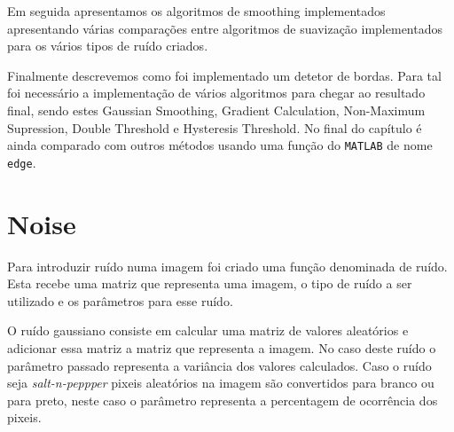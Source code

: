 \documentclass[a4paper]{report}
\begin{document}
Em seguida apresentamos os algoritmos de smoothing implementados apresentando várias
comparações entre algoritmos de suavização implementados para os vários tipos de ruído criados.

Finalmente descrevemos como foi implementado um detetor de bordas. Para tal foi necessário a
implementação de vários algoritmos para chegar ao resultado final, sendo estes Gaussian Smoothing, Gradient Calculation,
Non-Maximum Supression, Double Threshold e Hysteresis Threshold. No final do capítulo é ainda comparado com outros
métodos usando uma função do \texttt{MATLAB} de nome \texttt{edge}.

\chapter{Noise}
Para introduzir ruído numa imagem foi criado uma função denominada de ruído.
Esta recebe uma matriz que representa uma imagem, o tipo de ruído a ser
utilizado e os parâmetros para esse ruído.

O ruído gaussiano consiste em calcular uma matriz de valores aleatórios e adicionar essa matriz a
matriz que representa a imagem. No caso deste ruído o parâmetro passado representa a variância
dos valores calculados. Caso o ruído seja \textit{salt-n-peppper} pixeis aleatórios na imagem são 
convertidos para branco ou para preto, neste caso o parâmetro representa a percentagem de
ocorrência dos pixeis.
\end{document}
